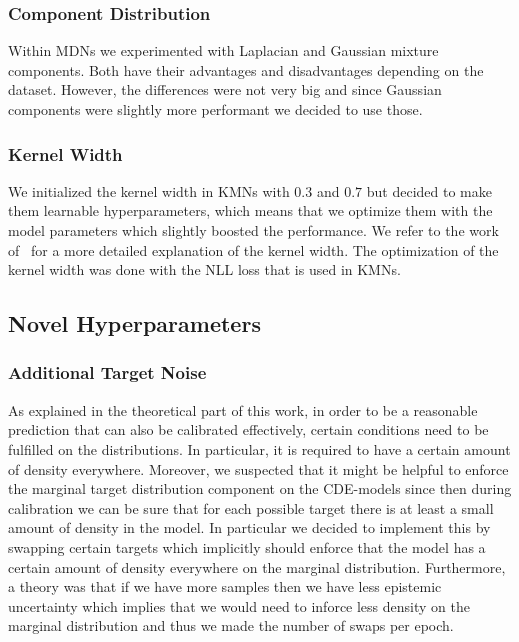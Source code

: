 \subsubsection{Component Distribution}
Within MDNs we experimented with Laplacian and Gaussian mixture components. Both have their advantages and disadvantages depending on the dataset. However, the differences were not very big and since Gaussian components were slightly more performant we decided to use those.

\subsubsection{Kernel Width}
We initialized the kernel width in KMNs with $0.3$ and $0.7$ but decided to make them learnable hyperparameters, which means that we optimize them with the model parameters which slightly boosted the performance. We refer to the work of~\cite{ambrogioni2017kernel} for a more detailed explanation of the kernel width. The optimization of the kernel width was done with the NLL loss that is used in KMNs.

\subsection{Novel Hyperparameters}

\subsubsection{Additional Target Noise}

As explained in the theoretical part of this work, in order to be a reasonable prediction that can also be calibrated effectively, certain conditions need to be fulfilled on the distributions. In particular, it is required to have a certain amount of density everywhere. Moreover, we suspected that it might be helpful to enforce the marginal target distribution component on the CDE-models since then during calibration we can be sure that for each possible target there is at least a small amount of density in the model. In particular we decided to implement this by swapping certain targets which implicitly should enforce that the model has a certain amount of density everywhere on the marginal distribution. Furthermore, a theory was that if we have more samples then we have less epistemic uncertainty which implies that we would need to inforce less density on the marginal distribution and thus we made the number of swaps per epoch.

